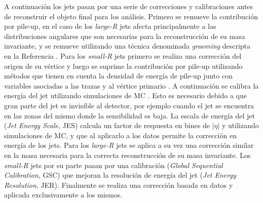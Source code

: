 A continuación los jets pasan por una serie de correcciones y calibraciones antes de reconstruir el objeto final para los análisis. Primero se remueve la contribución por pile-up, en el caso de los \textit{large-R} jets afecta principalmente a las distribuciones angulares que son necesarias para la reconstrucción de su masa invariante, y se remueve utilizando una técnica denominada \textit{grooming} descripta en la Referencia \cite{trimming}. Para los \textit{small-R} jets primero se realiza una corrección del origen de su vértice y luego se suprime la contribución por pile-up utilizando métodos que tienen en cuenta la densidad de energía de pile-up \cite{PERF-2016-04} junto con variables asociadas a las trazas y al vértice primario \cite{PERF-2014-03} .
A continuación se calibra la energía del jet utilizando simulaciones de MC
. Esto es necesario debido a que gran parte del jet es invisible al detector, por ejemplo cuando el jet se encuentra en las zonas del mismo donde la sensibilidad es baja. 
La escala de energía del jet (\textit{Jet Energy Scale}, JES) \cite{JETM-2018-05} calcula un factor de respuesta en bines de $|\eta|$ y \pt utilizando simulaciones de MC, y que al aplicarlo a los datos permite la corrección en energía de los jets. Para los \textit{large-R} jets se aplica a su vez una corrección similar en la masa necesaria para la correcta reconstrucción de su masa invariante. Los \textit{small-R} jets por su parte pasan por una calibración (\textit{Global Sequential Calibration}, GSC) que mejoran la resolución de energía del jet (\textit{Jet Energy Resolution}, JER). Finalmente se realiza una corrección basada en datos y aplicada exclusivamente a los mismos.


